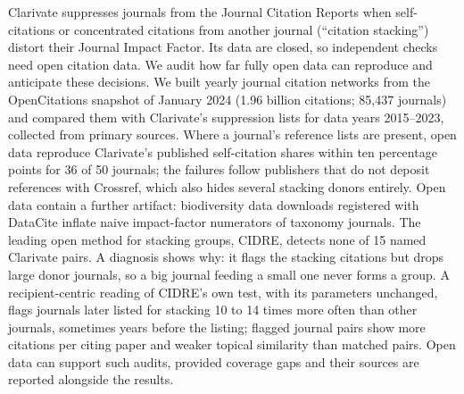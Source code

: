 Clarivate suppresses journals from the Journal Citation Reports when self-citations or concentrated citations from
another journal (``citation stacking'') distort their Journal Impact Factor. Its data are closed, so independent
checks need open citation data. We audit how far fully open data can reproduce and anticipate these decisions. We
built yearly journal citation networks from the OpenCitations snapshot of January 2024 (1.96 billion citations;
85,437 journals) and compared them with Clarivate's suppression lists for data years 2015--2023, collected from
primary sources. Where a journal's reference lists are present, open data reproduce Clarivate's published
self-citation shares within ten percentage points for 36 of 50 journals; the failures follow publishers that do not
deposit references with Crossref, which also hides several stacking donors entirely. Open data contain a further
artifact: biodiversity data downloads registered with DataCite inflate naive impact-factor numerators of taxonomy
journals. The leading open method for stacking groups, CIDRE, detects none of 15 named Clarivate pairs. A
diagnosis shows why: it flags the stacking citations but drops large donor journals, so a big journal feeding a small
one never forms a group. A recipient-centric reading of CIDRE's own test, with its parameters unchanged, flags
journals later listed for stacking 10 to 14 times more often than other journals, sometimes years before the
listing; flagged journal pairs show more citations per citing paper and weaker topical similarity than matched pairs.
Open data can support such audits, provided coverage gaps and their sources are reported alongside the results.
